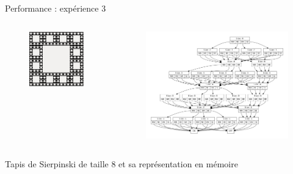 \documentclass{beamer}
\begin{document}
\begin{frame}{Performance : expérience 3}
  \begin{columns}[c]
    \begin{column}{5cm}
      \begin{figure}
        \centering
        \includegraphics[scale=0.3]{perf_carpet.png}
      \end{figure}
    \end{column}
    \begin{column}{5cm}
      \begin{figure}
        \centering
        \includegraphics[scale=0.15]{perf_memCarpet.pdf}
      \end{figure}
    \end{column}
  \end{columns}
  \begin{center}
    Tapis de Sierpinski de taille 8 et sa représentation en mémoire
  \end{center}
\end{frame}
\end{document}
